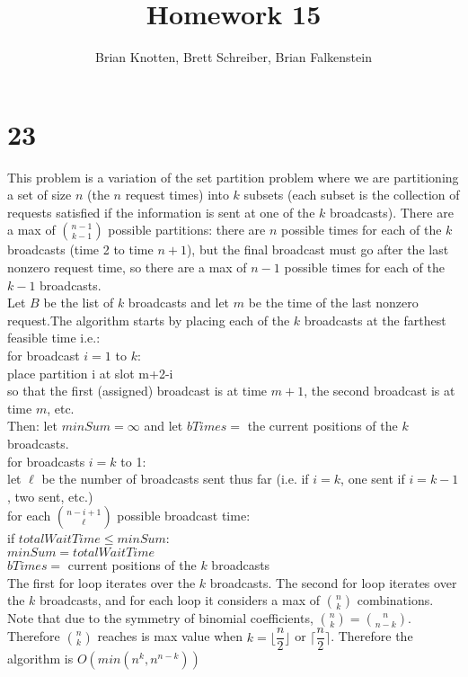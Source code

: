 \documentclass[letterpaper,notitlepage,twoside]{article}
\newcommand\tab[1][1cm]{\hspace*{#1}} %
\begin{document}
\title{Homework 15}
\author{Brian Knotten, Brett Schreiber, Brian Falkenstein}
\maketitle

\section*{23}
This problem is a variation of the set partition problem where we are partitioning a set of size $n$ (the $n$ request times) into $k$ subsets (each subset is the collection of requests satisfied if the information is sent at one of the $k$ broadcasts). There are a max of ${n-1 \choose k-1}$ possible partitions: there are $n$ possible times for each of the $k$ broadcasts (time 2 to time $n+1$), but the final broadcast must go after the last nonzero request time, so there are a max of $n-1$ possible times for each of the $k-1$ broadcasts.\\
Let $B$ be the list of $k$ broadcasts and let $m$ be the time of the last nonzero request.The algorithm starts by placing each of the $k$ broadcasts at the farthest feasible time i.e.: \\
for broadcast $i = 1$ to $k$:\\
\tab place partition i at slot m+2-i\\
so that the first (assigned) broadcast is at time $m+1$, the second broadcast is at time $m$, etc. \\
Then: let $minSum = \infty$ and let $bTimes =$ the current positions of the $k$ broadcasts. \\
for broadcasts $i = k$ to 1:\\
\tab let $\ell$ be the number of broadcasts sent thus far (i.e. if $i = k$, one sent if $i=k-1$, two sent, etc.)\\
\tab for each ${n-i+1 \choose \ell}$ possible broadcast time:\\
\tab\tab if $totalWaitTime \leq minSum$:\\
\tab\tab\tab $minSum = totalWaitTime$\\
\tab\tab\tab $bTimes =$ current positions of the $k$ broadcasts\\
The first for loop iterates over the $k$ broadcasts. The second for loop iterates over the $k$ broadcasts, and for each loop it considers a max of ${n \choose k}$ combinations. Note that due to the symmetry of binomial coefficients, ${n \choose k} = {n \choose n-k}$. Therefore ${n \choose k}$ reaches is max value when $k = \lfloor\dfrac{n}{2}\rfloor$ or $\lceil\dfrac{n}{2}\rceil$. Therefore the algorithm is $O(min(n^{k}, n^{n-k}))$
\end{document}
